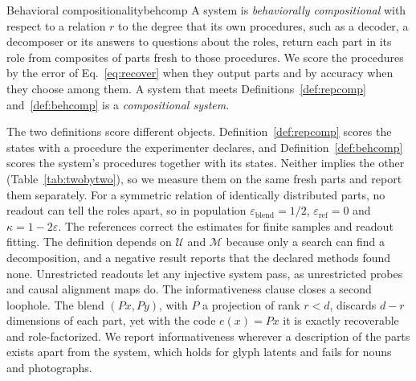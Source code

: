 \documentclass[10pt]{article}
\theoremstyle{plain}
\theoremstyle{remark}
\newcommand{\U}{\mathcal{U}}
\newcommand{\M}{\mathcal{M}}
\begin{document}
\begin{defbox}{Behavioral compositionality}{behcomp}
A system is \emph{behaviorally compositional} with respect to a relation $r$ to the degree that its own procedures, such as a decoder, a decomposer or its answers to questions about the roles, return each part in its role from composites of parts fresh to those procedures. We score the procedures by the error of Eq.~\ref{eq:recover} when they output parts and by accuracy when they choose among them. A system that meets Definitions~\ref{def:repcomp} and~\ref{def:behcomp} is a \emph{compositional system}.
\end{defbox}

The two definitions score different objects. Definition~\ref{def:repcomp} scores the states with a procedure the experimenter declares, and Definition~\ref{def:behcomp} scores the system's procedures together with its states. Neither implies the other (Table~\ref{tab:twobytwo}), so we measure them on the same fresh parts and report them separately. For a symmetric relation of identically distributed parts, no readout can tell the roles apart, so in population $\varepsilon_{\mathrm{blend}} = 1/2$, $\varepsilon_{\mathrm{ref}} = 0$ and $\kappa = 1 - 2\varepsilon$. The references correct the estimates for finite samples and readout fitting. The definition depends on $\U$ and $\M$ because only a search can find a decomposition, and a negative result reports that the declared methods found none. Unrestricted readouts let any injective system pass, as unrestricted probes \citep{hewitt2019} and causal alignment maps \citep{sutter2025} do. The informativeness clause closes a second loophole. The blend $(Px, Py)$, with $P$ a projection of rank $r < d$, discards $d - r$ dimensions of each part, yet with the code $e(x) = Px$ it is exactly recoverable and role-factorized. We report informativeness wherever a description of the parts exists apart from the system, which holds for glyph latents and fails for nouns and photographs.
\end{document}

